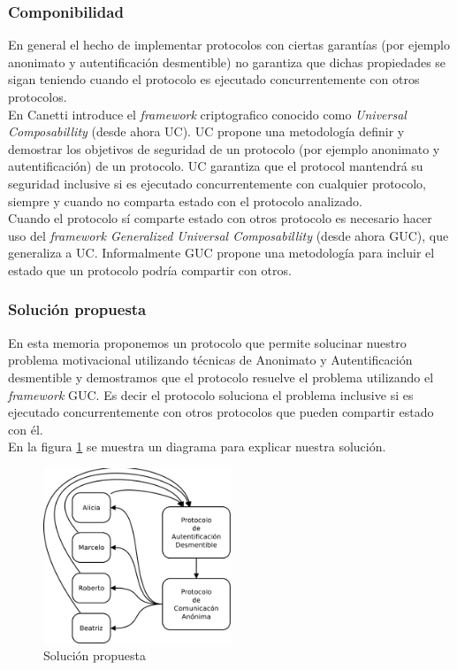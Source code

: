 \subsubsection{Componibilidad}
En general el hecho de implementar protocolos con ciertas garantías (por ejemplo anonimato y
autentificación desmentible) no garantiza que dichas propiedades se sigan teniendo cuando
el protocolo es ejecutado concurrentemente con otros protocolos.\\
En \cite{conf/focs/Canetti01} Canetti introduce el \textit{framework} criptografico conocido
como \textit{Universal Composabillity} (desde ahora UC). UC propone una metodología definir y
demostrar los objetivos de seguridad de un protocolo (por ejemplo anonimato y autentificación)
de un protocolo. UC garantiza que el protocol mantendrá su seguridad inclusive
si es ejecutado concurrentemente con cualquier protocolo, siempre y cuando no comparta estado
con el protocolo analizado.\\
Cuando el protocolo sí comparte estado con otros protocolo es necesario hacer uso del
\textit{framework Generalized Universal Composabillity} (desde ahora GUC), que generaliza a UC.
Informalmente GUC propone una metodología para incluir el estado que un protocolo podría compartir
con otros.

\subsubsection{Solución propuesta}
En esta memoria proponemos un protocolo que permite solucinar nuestro problema motivacional
utilizando técnicas de Anonimato y Autentificación desmentible y demostramos que el protocolo
resuelve el problema utilizando el \textit{framework} GUC. Es decir el protocolo soluciona
el problema inclusive si es ejecutado concurrentemente con otros protocolos que pueden compartir
estado con él.\\
En la figura \ref{sigmix_simple} se muestra un diagrama para explicar nuestra solución.

\begin{figure}[hp]
    \centering
    \includegraphics[width=0.5\textwidth]{figs/sigmix_simple}
    \caption{Solución propuesta}
    \label{sigmix_simple}
\end{figure}

